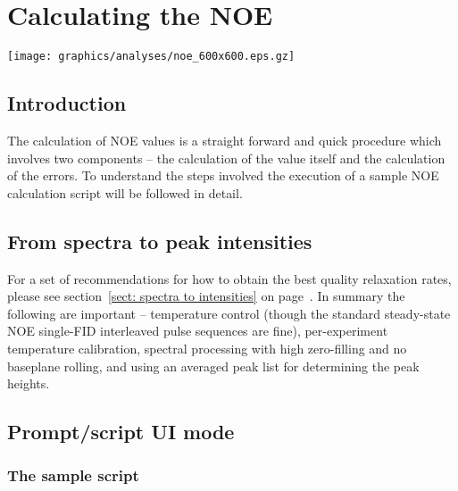 
\chapter{Calculating the NOE} \label{ch: NOE}


\begin{figure*}[h]
\texttt{[image: graphics/analyses/noe\_600x600.eps.gz]}
\end{figure*}



\section{Introduction}

The calculation of NOE values is a straight forward and quick procedure which involves two components -- the calculation of the value itself and the calculation of the errors.  To understand the steps involved the execution of a sample NOE calculation script will be followed in detail.




\section{From spectra to peak intensities}

For a set of recommendations for how to obtain the best quality relaxation rates, please see section~\ref{sect: spectra to intensities} on page~\pageref{sect: spectra to intensities}.  In summary the following are important -- temperature control (though the standard steady-state NOE single-FID interleaved pulse sequences are fine), per-experiment temperature calibration, spectral processing with high zero-filling and no baseplane rolling, and using an averaged peak list for determining the peak heights.



\section{Prompt/script UI mode}



\subsection{The sample script}

